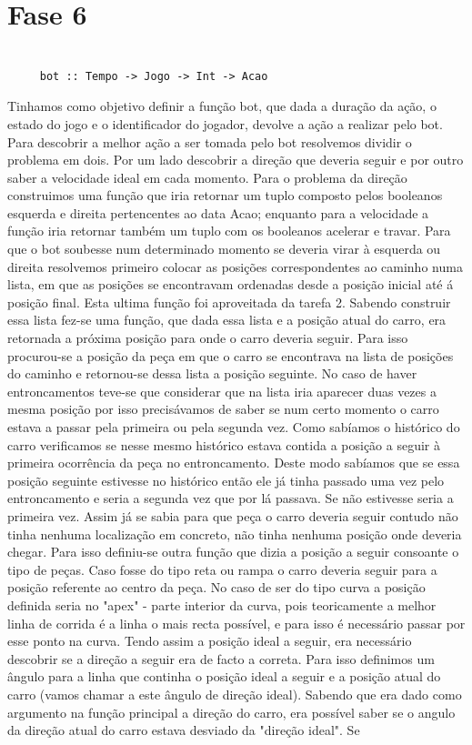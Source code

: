 \documentclass[a4paper]{report} %
\begin{document}
    

\section{Fase 6}

\begin{verbatim}

     bot :: Tempo -> Jogo -> Int -> Acao

\end{verbatim}
    Tinhamos como objetivo definir a função bot, que dada a duração da ação, o estado do jogo e o identificador do jogador, devolve a ação a realizar pelo bot.
	Para descobrir a melhor ação a ser tomada pelo bot resolvemos dividir o problema em dois. Por um lado descobrir a direção que deveria seguir e por outro saber a velocidade ideal em cada momento. Para o problema da direção construimos uma função que iria retornar um tuplo composto pelos booleanos esquerda e direita pertencentes ao data Acao; enquanto para a velocidade a função iria retornar também um tuplo com os booleanos acelerar e travar. Para que o bot soubesse num determinado momento se deveria virar à esquerda ou direita resolvemos primeiro colocar as posições correspondentes ao caminho numa lista, em que as posições se encontravam ordenadas desde a posição inicial até á posição final. Esta ultima função foi aproveitada da tarefa 2. Sabendo construir essa lista fez-se uma função, que dada essa lista e a posição atual do carro, era retornada a próxima posição para onde o carro deveria seguir. Para isso procurou-se a posição da peça em que o carro se encontrava na lista de posições do caminho e retornou-se dessa lista a posição seguinte. No caso de haver entroncamentos teve-se que considerar que na lista iria aparecer duas vezes a mesma posição por isso precisávamos de saber se num certo momento o carro estava a passar pela primeira ou pela segunda vez. Como sabíamos o histórico do carro verificamos se nesse mesmo histórico estava contida a posição a seguir à primeira ocorrência da peça no entroncamento. Deste modo sabíamos que se essa posição seguinte estivesse no histórico então ele já tinha passado uma vez pelo entroncamento e seria a segunda vez que por lá passava. Se não estivesse seria a primeira vez. Assim já se sabia para que peça o carro deveria seguir contudo não tinha nenhuma localização em concreto, não tinha nenhuma posição onde deveria chegar. Para isso definiu-se outra função que dizia a posição a seguir consoante o tipo de peças. Caso fosse do tipo reta ou rampa o carro deveria seguir para a posição referente ao centro da peça. No caso de ser do tipo curva a posição definida seria no "apex" - parte interior da curva, pois teoricamente a melhor linha de corrida é a linha o mais recta possível, e para isso é necessário passar por esse ponto na curva. Tendo assim a posição ideal a seguir, era necessário descobrir se a direção a seguir era de facto a correta. Para isso definimos um ângulo para a linha que continha o posição ideal a seguir e a posição atual do carro (vamos chamar a este ângulo de direção ideal). Sabendo que era dado como argumento na função principal a direção do carro, era possível saber se o angulo da direção atual do carro estava desviado da "direção ideal". Se 
\end{document}
